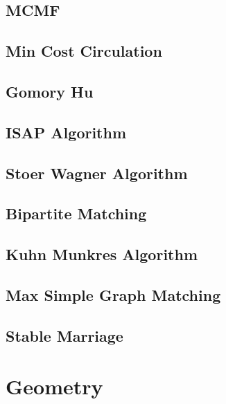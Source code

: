 \documentclass{article}
\begin{document}
\subsection{MCMF}


\subsection{Min Cost Circulation}


\subsection{Gomory Hu}


\subsection{ISAP Algorithm}


\subsection{Stoer Wagner Algorithm}


\subsection{Bipartite Matching}


\subsection{Kuhn Munkres Algorithm}


\subsection{Max Simple Graph Matching}


\subsection{Stable Marriage}


\section{Geometry}
\end{document}
